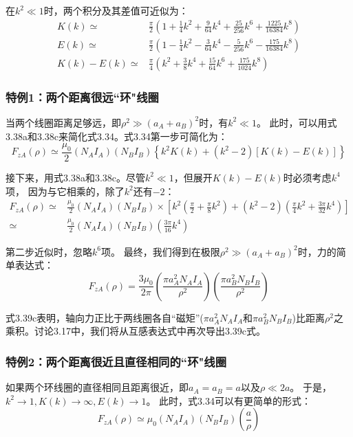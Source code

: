 在$k^2\ll 1$时，两个积分及其差值可近似为：
\begin{subequations}
	\begin{align}
  K(k) \simeq&  \frac{\pi}{2}\left(1+\frac{1}{4}k^2+\frac{9}{64}k^4+\frac{25}{256}k^6+\frac{1225}{16384}k^8\right)\\
  E(k) \simeq&  \frac{\pi}{2}\left(1-\frac{1}{4}k^2-\frac{3}{64}k^4-\frac{5}{256}k^6-\frac{175}{16384}k^8\right)\\ 
  K(k)-E(k) \simeq& \frac{\pi}{4}\left(k^2+\frac{3}{8}k^4+\frac{15}{64}k^6+\frac{175}{1024}k^8\right) 
  	\end{align}
\end{subequations}

\subsubsection{特例1：两个距离很远``环"线圈}
当两个线圈距离足够远，即$\rho^2 \gg (a_A+a_B)^2$时，有$k^2\ll 1$。
此时，可以用式3.38a和3.38c来简化式3.34。式3.34第一步可简化为：
\begin{equation}
  F_{zA}(\rho)\simeq \frac{\mu_0}{2}(N_A I_A)(N_B I_B)\left\{ k^2K(k)+(k^2-2)[K(k)-E(k)]\right\}
\end{equation}

接下来，用式3.38a和3.38c。尽管$k^2\ll 1$，但展开$K(k)-E(k)$时必须考虑$k^4$项，
因为与它相乘的，除了$k^2$还有$-2$：
\begin{align*}
F_{zA}(\rho)\simeq&\frac{\mu_0}{2}(N_AI_A)(N_BI_B)\times\left[k^2\left(\frac{\pi}{2}+\frac{\pi}{8}k^2\right)+(k^2-2)\left(\frac{\pi}{4}k^2+\frac{3\pi}{32}k^4\right)\right]\\
\simeq& \frac{\mu_0}{2}(N_A I_A)(N_B I_B)\left(\frac{3\pi}{16}k^4\right) \tag{3.39b}
\end{align*}

第二步近似时，忽略$k^6$项。
最终，我们得到在极限$\rho^2 \gg (a_A+a_B)^2$时，力的简单表达式：
\begin{equation*}
F_{zA}(\rho)= \frac{3\mu_0}{2\pi}\left(\frac{\pi a_A^2 N_A I_A}{\rho^2}\right)\left(\frac{\pi a_B^2 N_B I_B}{\rho^2}\right) \tag{3.39c}
\end{equation*}

式3.39c表明，轴向力正比于两线圈各自``磁矩''($\pi a_A^2 N_A I_A$和$\pi a_B^2 N_B I_B$)比距离$\rho^2$之乘积。讨论3.17中，我们将从互感表达式中再次导出3.39c式。

\subsubsection{特例2：两个距离很近且直径相同的``环"线圈}
如果两个环线圈的直径相同且距离很近，即$a_A=a_B=a$以及$\rho\ll 2a$。
于是，$k^2\rightarrow 1,K(k)\rightarrow\infty,E(k)\rightarrow 1$。
此时，式3.34可以有更简单的形式：
\begin{equation*}
F_{zA}(\rho)\simeq \mu_0(N_A I_A)(N_B I_B)\left(\frac{a}{\rho}\right) \tag{3.39d}
\end{equation*}

